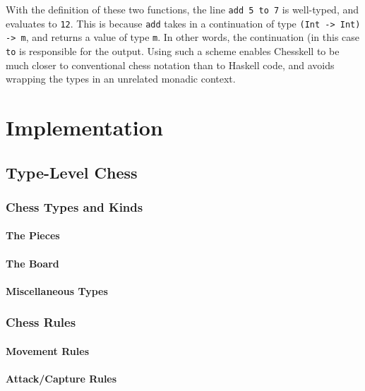 \documentclass[12pt, a4paper, bibliography=totocnumbered]{scrreprt}
\newcommand{\inline}[1]{\lstinline[basicstyle=\ttfamily\footnotesize]{#1}}
\begin{document}
With the definition of these two functions, the line \inline{add 5 to 7} is well-typed, and evaluates to \inline{12}. This is because \inline{add} takes in a continuation of type \inline{(Int -> Int) -> m}, and returns a value of type \inline{m}. In other words, the continuation (in this case \inline{to} is responsible for the output. Using such a scheme enables Chesskell to be much closer to conventional chess notation than to Haskell code, and avoids wrapping the types in an unrelated monadic context.


\chapter{Implementation}

\section{Type-Level Chess}

\subsection{Chess Types and Kinds}

\subsubsection{The Pieces}

\subsubsection{The Board}

\subsubsection{Miscellaneous Types}

\subsection{Chess Rules}

\subsubsection{Movement Rules}

\subsubsection{Attack/Capture Rules}
\end{document}

